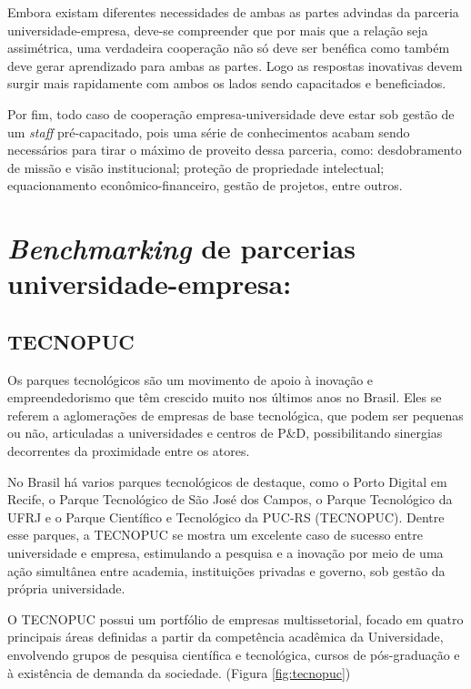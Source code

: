 Embora existam diferentes necessidades de ambas as partes advindas da parceria universidade-empresa, deve-se compreender que por mais que a relação seja assimétrica, uma verdadeira cooperação não só deve ser benéfica como também deve gerar aprendizado para ambas as partes. Logo as respostas inovativas devem surgir mais rapidamente com ambos os lados sendo capacitados e beneficiados.

Por fim, todo caso de cooperação empresa-universidade deve estar sob gestão de um \textit{staff} pré-capacitado, pois uma série de conhecimentos acabam sendo necessários para tirar o máximo de proveito dessa parceria, como: desdobramento de missão e visão institucional; proteção de propriedade intelectual; equacionamento econômico-financeiro, gestão de projetos, entre outros.

\section{\textit{Benchmarking} de parcerias universidade-empresa:} %
\label{sec:cases}

\subsection{TECNOPUC}

Os parques tecnológicos são um movimento de apoio à inovação e empreendedorismo que têm crescido muito nos últimos anos no Brasil. Eles se referem a aglomerações de empresas de base tecnológica, que podem ser pequenas ou não, articuladas a universidades e centros de P\&D, possibilitando sinergias decorrentes da proximidade entre os atores. \cite{parquestecnologicos} 

No Brasil há varios parques tecnológicos de destaque, como o Porto Digital em Recife, o Parque Tecnológico de São José dos Campos, o Parque Tecnológico da UFRJ e o Parque Científico e Tecnológico da PUC-RS (TECNOPUC). Dentre esse parques, a TECNOPUC se mostra um excelente caso de sucesso entre universidade e empresa, estimulando a pesquisa e a inovação por meio de uma ação simultânea entre academia, instituições privadas e governo, sob gestão da própria universidade.

O TECNOPUC possui um portfólio de empresas multissetorial, focado em quatro principais áreas definidas a partir da competência acadêmica da Universidade, envolvendo grupos de pesquisa científica e tecnológica, cursos de pós-graduação e à existência de demanda da sociedade. (Figura \ref{fig:tecnopuc})

